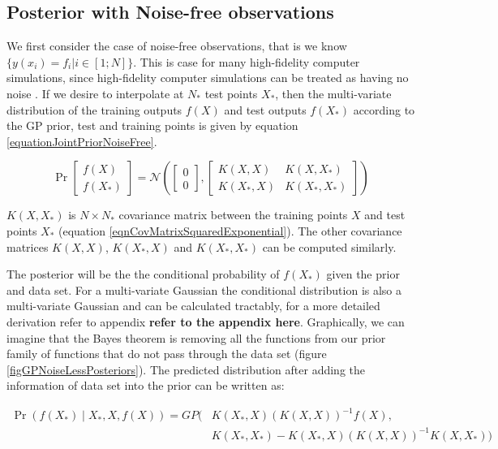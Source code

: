 \subsection{Posterior with Noise-free observations}\label{subSecPosteriorNoiseFree}
We first consider the case of noise-free observations, that is we know \(\{y(x_{i}) = f_{i} | i \in [1; N] \}\). This is case for many high-fidelity computer simulations, since high-fidelity computer simulations can be treated as having no noise \cite{sacks1989design}. If we desire to interpolate at \(N_{*}\) test points \(X_{*}\), then the multi-variate distribution of the training outputs \(f(X)\) and test outputs \(f(X_{*})\) according to the GP prior, test and training points is given by equation \ref{equationJointPriorNoiseFree}.

\begin{equation}\label{equationJointPriorNoiseFree}
\Pr\left [ \begin{matrix}
f(X)
\\ f(X_{*})
\end{matrix} \right ] = 
\mathcal{N}\left (\left [ \begin{matrix} 0 \\ 0 \end{matrix} \right ]
, 
\left [ \begin{matrix}
K(X, X) & K(X, X_{*})\\ 
K(X_{*}, X) & K(X_{*}, X_{*})
\end{matrix} \right ]
\right)
\end{equation}

\(K(X, X_{*})\) is \(N \times N_{*}\) covariance matrix between the training points \(X\) and test points \(X_{*}\) (equation \ref{eqnCovMatrixSquaredExponential}). The other covariance matrices \(K(X, X)\), \(K(X_{*}, X)\) and \(K(X_{*}, X_{*})\) can be computed similarly. 

The posterior will be the the conditional probability of \(f(X_{*})\) given the prior and data set. For a multi-variate Gaussian the conditional distribution is also a multi-variate Gaussian and can be calculated tractably, for a more detailed derivation refer to appendix \textbf{refer to the appendix here}. Graphically, we can imagine that the Bayes theorem is removing all the functions from our prior family of functions that do not pass through the data set (figure \ref{figGPNoiseLessPosteriors}). The predicted distribution after adding the information of data set into the prior can be written as:

  \begin{equation}\label{eqNoiseFreePosteriorGP}
  \begin{aligned}
  \Pr(f(X_{*}) \mid X_{*}, X, f(X)) = GP(  & K(X_{*}, X)( K(X, X) )^{-1}f(X),   \\ 
                                & K(X_{*}, X_{*}) - K(X_{*}, X)( K(X, X) )^{-1} K(X, X_{*}))
  \end{aligned}
  \end{equation}

